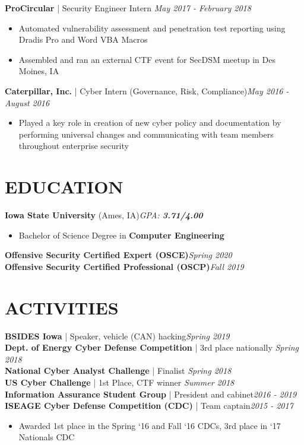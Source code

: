 \documentclass[line]{res}
\begin{document}
\begin{resume}
\textbf{ProCircular} | Security Engineer Intern \hfill \textit{May 2017 - February 2018}
\begin{itemize}
	\item Automated vulnerability assessment and penetration test reporting using Dradis Pro and Word VBA Macros
	\item Assembled and ran an external CTF event for SecDSM meetup in Des Moines, IA
\end{itemize}

\textbf{Caterpillar, Inc.} | Cyber Intern (Governance, Risk, Compliance)\hfill \textit{May 2016 - August 2016}
\begin{itemize}
	\item Played a key role in creation of new cyber policy and documentation by performing universal changes and communicating with team members throughout enterprise security
\end{itemize}

\section{EDUCATION}
\textbf{Iowa State University} (Ames, IA)\hfill \textit{GPA: \textbf{3.71/4.00}}
\begin{itemize}
    \item Bachelor of Science Degree in \textbf{Computer Engineering}
\end{itemize}
\textbf{Offensive Security Certified Expert (OSCE)}\hfill \textit{Spring 2020}\\
\textbf{Offensive Security Certified Professional (OSCP)}\hfill \textit{Fall 2019}


\section{ACTIVITIES}
\textbf{BSIDES Iowa} | Speaker, vehicle (CAN) hacking\hfill \textit{Spring 2019}\\
\textbf{Dept. of Energy Cyber Defense Competition} | 3rd place nationally \hfill \textit{Spring 2018}\\
\textbf{National Cyber Analyst Challenge} | Finalist \hfill \textit{Spring 2018}\\
\textbf{US Cyber Challenge} | 1st Place, CTF winner \hfill \textit{Summer 2018}\\
\textbf{Information Assurance Student Group} | President and cabinet\hfill \textit{2016 - 2019}\\
\textbf{ISEAGE Cyber Defense Competition (CDC)} | Team captain\hfill \textit{2015 - 2017}
\begin{itemize}
	\item Awarded 1st place in the Spring ‘16 and Fall ‘16 CDCs, 3rd place in ‘17 Nationals CDC
\end{itemize}


\end{resume}
\end{document}
